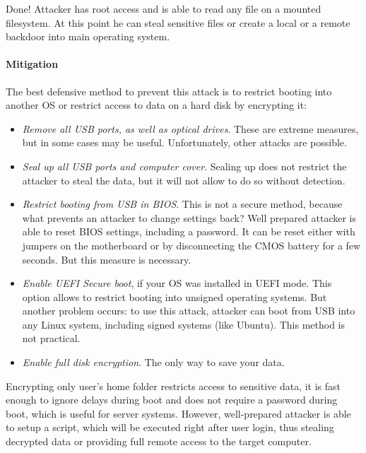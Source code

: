 Done! Attacker has root access and is able to read any file on a mounted filesystem. At this point he can steal sensitive files or create a local or a remote backdoor into main operating system. 


\paragraph*{Mitigation}
The best defensive method to prevent this attack is to restrict booting into another OS or restrict access to data on a hard disk by encrypting it:

\begin{itemize}
    \item \textit{Remove all USB ports, as well as optical drives}. These are extreme measures, but in some cases may be useful. Unfortunately, other attacks are possible.
    
    \item \textit{Seal up all USB ports and computer cover}. Sealing up does not restrict the attacker to steal the data, but it will not allow to do so without detection. 
    
    \item \textit{Restrict booting from USB in BIOS}. This is not a secure method, because what prevents an attacker to change settings back? Well prepared attacker is able to reset BIOS settings, including a password. It can be reset either with jumpers on the motherboard or by disconnecting the CMOS battery for a few seconds. But this measure is necessary.
    
    \item \textit{Enable UEFI Secure boot}, if your OS was installed in UEFI mode. This option allows to restrict booting into unsigned operating systems. But another problem occurs: to use this attack, attacker can boot from USB into any Linux system, including signed systems (like Ubuntu). This method is not practical.
    
    \item \textit{Enable full disk encryption}. The only way to save your data. 
\end{itemize}

Encrypting only user's home folder restricts access to sensitive data, it is fast enough to ignore delays during boot and does not require a password during boot, which is useful for server systems. However, well-prepared attacker is able to setup a script, which will be executed right after user login, thus stealing decrypted data or providing full remote access to the target computer.


